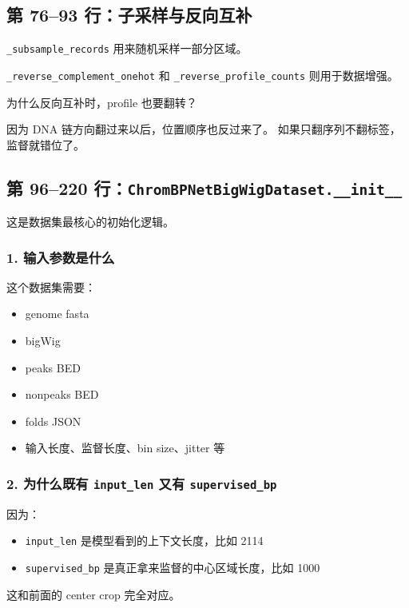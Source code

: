 \documentclass[11pt,a4paper]{ctexart}
\begin{document}
\subsection{第 76--93 行：子采样与反向互补}

\texttt{\_subsample\_records} 用来随机采样一部分区域。

\texttt{\_reverse\_complement\_onehot} 和
\texttt{\_reverse\_profile\_counts} 则用于数据增强。

为什么反向互补时，profile 也要翻转？

因为 DNA 链方向翻过来以后，位置顺序也反过来了。
如果只翻序列不翻标签，监督就错位了。

\subsection{第 96--220 行：\texttt{ChromBPNetBigWigDataset.\_\_init\_\_}}

这是数据集最核心的初始化逻辑。

\subsubsection*{1. 输入参数是什么}

这个数据集需要：

\begin{itemize}[leftmargin=2em]
\item genome fasta
\item bigWig
\item peaks BED
\item nonpeaks BED
\item folds JSON
\item 输入长度、监督长度、bin size、jitter 等
\end{itemize}

\subsubsection*{2. 为什么既有 \texttt{input\_len} 又有 \texttt{supervised\_bp}}

因为：

\begin{itemize}[leftmargin=2em]
\item \texttt{input\_len} 是模型看到的上下文长度，比如 2114
\item \texttt{supervised\_bp} 是真正拿来监督的中心区域长度，比如 1000
\end{itemize}

这和前面的 center crop 完全对应。
\end{document}
